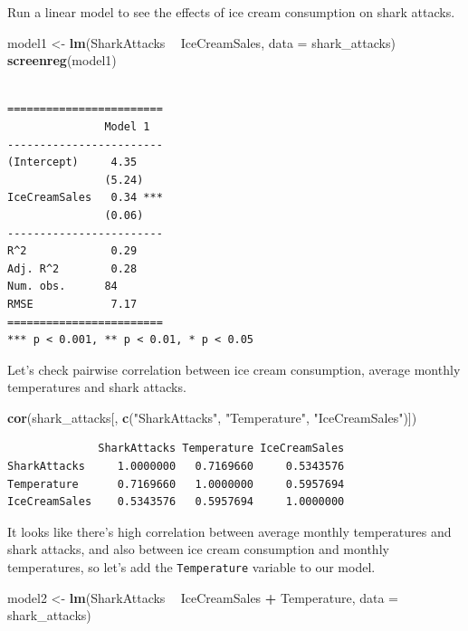 \documentclass[]{article}
\newenvironment{Shaded}{\begin{snugshade}}{\end{snugshade}}
\newcommand{\KeywordTok}[1]{\textcolor[rgb]{0.13,0.29,0.53}{\textbf{#1}}}
\newcommand{\DataTypeTok}[1]{\textcolor[rgb]{0.13,0.29,0.53}{#1}}
\newcommand{\StringTok}[1]{\textcolor[rgb]{0.31,0.60,0.02}{#1}}
\newcommand{\OperatorTok}[1]{\textcolor[rgb]{0.81,0.36,0.00}{\textbf{#1}}}
\newcommand{\NormalTok}[1]{#1}
\theoremstyle{definition}
\theoremstyle{definition}
\theoremstyle{definition}
\theoremstyle{remark}
\begin{document}
Run a linear model to see the effects of ice cream consumption on shark
attacks.

\begin{Shaded}
\begin{Highlighting}[]
\NormalTok{model1 <-}\StringTok{ }\KeywordTok{lm}\NormalTok{(SharkAttacks }\OperatorTok{~}\StringTok{ }\NormalTok{IceCreamSales, }\DataTypeTok{data =}\NormalTok{ shark_attacks)}
\KeywordTok{screenreg}\NormalTok{(model1)}
\end{Highlighting}
\end{Shaded}

\begin{verbatim}

========================
               Model 1  
------------------------
(Intercept)     4.35    
               (5.24)   
IceCreamSales   0.34 ***
               (0.06)   
------------------------
R^2             0.29    
Adj. R^2        0.28    
Num. obs.      84       
RMSE            7.17    
========================
*** p < 0.001, ** p < 0.01, * p < 0.05
\end{verbatim}

Let's check pairwise correlation between ice cream consumption, average
monthly temperatures and shark attacks.

\begin{Shaded}
\begin{Highlighting}[]
\KeywordTok{cor}\NormalTok{(shark_attacks[, }\KeywordTok{c}\NormalTok{(}\StringTok{"SharkAttacks"}\NormalTok{, }\StringTok{"Temperature"}\NormalTok{, }\StringTok{"IceCreamSales"}\NormalTok{)])}
\end{Highlighting}
\end{Shaded}

\begin{verbatim}
              SharkAttacks Temperature IceCreamSales
SharkAttacks     1.0000000   0.7169660     0.5343576
Temperature      0.7169660   1.0000000     0.5957694
IceCreamSales    0.5343576   0.5957694     1.0000000
\end{verbatim}

It looks like there's high correlation between average monthly
temperatures and shark attacks, and also between ice cream consumption
and monthly temperatures, so let's add the \texttt{Temperature} variable
to our model.

\begin{Shaded}
\begin{Highlighting}[]
\NormalTok{model2 <-}\StringTok{ }\KeywordTok{lm}\NormalTok{(SharkAttacks }\OperatorTok{~}\StringTok{ }\NormalTok{IceCreamSales }\OperatorTok{+}\StringTok{ }\NormalTok{Temperature, }\DataTypeTok{data =}\NormalTok{ shark_attacks)}
\end{Highlighting}
\end{Shaded}
\end{document}
